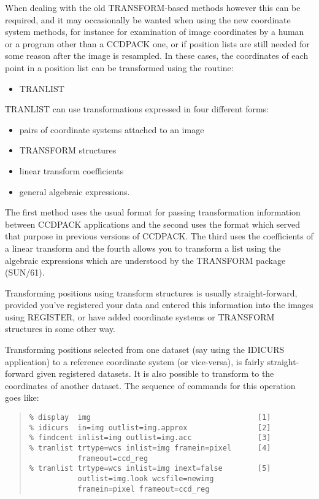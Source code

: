 \documentclass[twoside,11pt]{article}
\newcommand{\htmlref}[2]{#1}
\newcommand{\latexhtml}[2]{#1}
\newcommand{\xref}[3]{#1}
\renewcommand{\_}{\texttt{\symbol{95}}}
\newcommand{\ttsize}{\latexhtml{\small}{}}
\newenvironment{myquote}{\begin{quote}\ttsize}{\end{quote}}
\newcommand{\routine}[1]{{\sc #1}}
\newcommand{\xroutine}[1]{\htmlref{{\sc #1}}{#1}}
\begin{document}
When dealing with the old TRANSFORM-based methods however this can be required,
and it may occasionally be wanted when using the new coordinate system
methods, for instance for examination of image coordinates by
a human or a program other than a CCDPACK one, or if 
position lists are still needed for some reason after the
image is resampled.
In these cases, the coordinates of each point in a position 
list can be transformed using the routine:
\begin{itemize}
\item \xroutine{TRANLIST}
\end{itemize}
\routine{TRANLIST} can use transformations expressed in four different forms:
\begin{itemize}
\item pairs of coordinate systems attached to an image
\item TRANSFORM structures
\item linear transform coefficients
\item general algebraic expressions.
\end{itemize}
The first method uses the usual format for passing transformation
information between CCDPACK applications 
and the second uses the format which served 
that purpose in previous versions of CCDPACK.
The third uses the coefficients of a linear transform and the fourth
allows you to transform a list using the algebraic expressions which are
understood by the \xref{TRANSFORM package (SUN/61)}{sun61}{}.

Transforming positions using transform structures is usually
straight-forward, provided you've registered your data and 
entered this information into the images using \xroutine{REGISTER},
or have added coordinate systems or TRANSFORM structures in some other way.

Transforming positions selected from one dataset 
(say using the \xroutine{IDICURS}
application) to a reference coordinate system (or vice-versa), is
fairly straight-forward given registered datasets. It is also possible
to transform to the coordinates of another dataset. The sequence of
commands for this operation goes like:
\begin{myquote}
\begin{verbatim}
% display  img                                      [1]
% idicurs  in=img outlist=img.approx                [2]
% findcent inlist=img outlist=img.acc               [3]
% tranlist trtype=wcs inlist=img framein=pixel      [4]
           frameout=ccd_reg
% tranlist trtype=wcs inlist=img inext=false        [5]
           outlist=img.look wcsfile=newimg
           framein=pixel frameout=ccd_reg
\end{verbatim}
\end{myquote}
\end{document}
